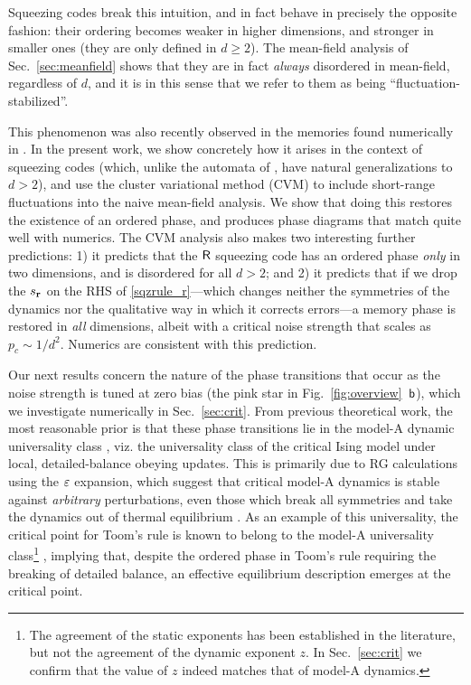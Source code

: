\documentclass[pra,aps,twocolumn,groupedaddress,superscriptaddress,nofootinbib,preprintnumbers]{revtex4-2}
\begin{document}
	Squeezing codes break this intuition, and in fact behave in precisely the opposite fashion: their ordering becomes weaker in higher dimensions, and stronger in smaller ones (they are only defined in $d\geq 2$). The mean-field analysis of Sec.~\ref{sec:meanfield} shows that they are in fact {\it always} disordered in mean-field, regardless of $d$, and it is in this sense that we refer to them as being ``fluctuation-stabilized''. 
	
	This phenomenon was also recently observed in the memories found numerically in \cite{pajouheshgar2025exploring}. In the present work, we show concretely how it arises in the context of squeezing codes (which, unlike the automata of \cite{pajouheshgar2025exploring}, have natural generalizations to $d>2$), and use the cluster variational method (CVM) \cite{kikuchi1951theory,pelizzola2005cluster} to include short-range fluctuations into the naive mean-field analysis. We show that doing this restores the existence of an ordered phase, and produces phase diagrams that match quite well with numerics. The CVM analysis also makes two interesting further predictions: 1) it predicts that the $\mathsf{R}$ squeezing code has an ordered phase {\it only} in two dimensions, and is disordered for all $d>2$; and 2) it predicts that if we drop the $s_{\mathbf{r}}$ on the RHS of \eqref{sqzrule_r}---which changes neither the symmetries of the dynamics nor the qualitative way in which it corrects errors---a memory phase is restored in {\it all} dimensions, albeit with a critical noise strength that scales as $p_c \sim 1/d^2$. Numerics are consistent with this prediction. 
	
	
	
	Our next results concern the nature of the phase transitions that occur as the noise strength is tuned at zero bias (the pink star in Fig.~\ref{fig:overview}~$\mathsf{b}$), which we investigate numerically in Sec.~\ref{sec:crit}. From previous theoretical work, the most reasonable prior is that these phase transitions lie in the model-A dynamic universality class \cite{hohenberg1977theory}, viz. the universality class of the critical Ising model under local, detailed-balance obeying updates. This is primarily due to RG calculations using the $\varepsilon$ expansion, which suggest that critical model-A dynamics is stable against {\it arbitrary} perturbations, even those which break all symmetries and take the dynamics out of thermal equilibrium \cite{grinstein1985statistical,bassler1994critical,tauber2002effects}. As an example of this universality, the critical point for Toom's rule is known to belong to the model-A universality class\footnote{The agreement of the static exponents has been established in the literature, but not the agreement of the dynamic exponent $z$. In Sec.~\ref{sec:crit} we confirm that the value of $z$ indeed matches that of model-A dynamics.}  \cite{makowiec2000study,ray2024protecting},  implying that, despite the ordered phase in Toom's rule requiring the breaking of detailed balance, an effective equilibrium description emerges at the critical point. 
	
\end{document}
